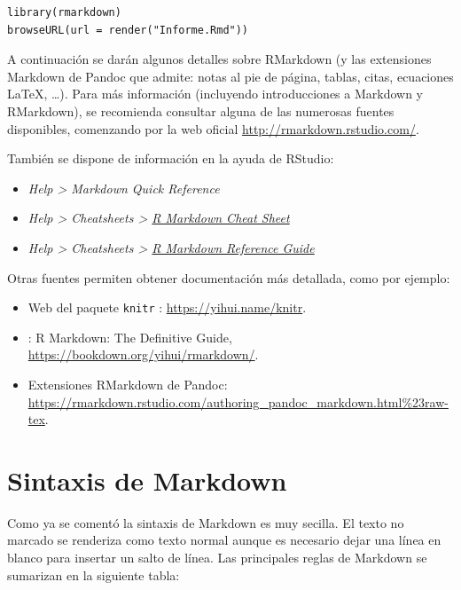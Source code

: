 \documentclass[
]{book}
\theoremstyle{break}
\theoremstyle{nonumberplain}
\begin{document}
\begin{verbatim}
library(rmarkdown)
browseURL(url = render("Informe.Rmd"))
\end{verbatim}

A continuación se darán algunos detalles sobre RMarkdown (y las extensiones Markdown de Pandoc que admite: notas al pie de página, tablas, citas, ecuaciones LaTeX, \ldots).
Para más información (incluyendo introducciones a Markdown y RMarkdown), se recomienda consultar alguna de las numerosas fuentes disponibles, comenzando por la web oficial \url{http://rmarkdown.rstudio.com/}.

También se dispone de información en la ayuda de RStudio:

\begin{itemize}
\item
  \emph{Help \textgreater{} Markdown Quick Reference}
\item
  \emph{Help \textgreater{} Cheatsheets \textgreater{} \href{https://www.rstudio.org/links/r_markdown_cheat_sheet}{R Markdown Cheat Sheet}}
\item
  \emph{Help \textgreater{} Cheatsheets \textgreater{} \href{https://www.rstudio.com/wp-content/uploads/2015/03/rmarkdown-reference.pdf}{R Markdown Reference Guide}}
\end{itemize}

Otras fuentes permiten obtener documentación más detallada, como por ejemplo:

\begin{itemize}
\item
  Web del paquete \texttt{knitr} \citep{R-knitr}: \url{https://yihui.name/knitr}.
\item
  \citet{xie2018r} : R Markdown: The Definitive Guide,
  \url{https://bookdown.org/yihui/rmarkdown/}.
\item
  Extensiones RMarkdown de Pandoc: \url{https://rmarkdown.rstudio.com/authoring_pandoc_markdown.html\%23raw-tex}.
\end{itemize}

\hypertarget{markdown}{%
\section{Sintaxis de Markdown}\label{markdown}}

Como ya se comentó la sintaxis de Markdown es muy secilla.
El texto no marcado se renderiza como texto normal aunque es necesario dejar una línea en blanco para insertar un salto de línea.
Las principales reglas de Markdown se sumarizan en la siguiente tabla:
\end{document}
